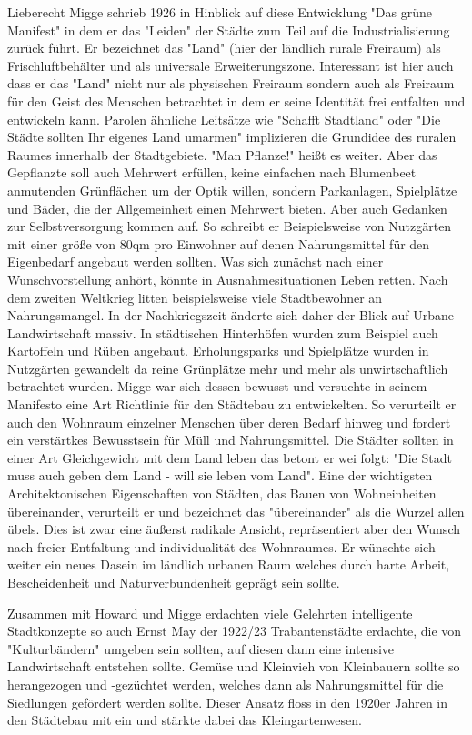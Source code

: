 \documentclass{article}
\begin{document}
Lieberecht Migge schrieb 1926 in Hinblick auf diese Entwicklung "Das grüne Manifest" in dem er das "Leiden" der Städte zum Teil auf die Industrialisierung zurück führt. Er bezeichnet das "Land" (hier der ländlich rurale Freiraum) als Frischluftbehälter und als universale Erweiterungszone. Interessant ist hier auch dass er das "Land" nicht nur als physischen Freiraum sondern auch als Freiraum für den Geist des Menschen betrachtet in dem er seine Identität frei entfalten und entwickeln kann. Parolen ähnliche Leitsätze wie "Schafft Stadtland" oder "Die Städte sollten Ihr eigenes Land umarmen" implizieren die Grundidee des ruralen Raumes innerhalb der Stadtgebiete. "Man Pflanze!" heißt es weiter. Aber das Gepflanzte soll auch Mehrwert erfüllen, keine einfachen nach Blumenbeet anmutenden Grünflächen um der Optik willen, sondern Parkanlagen, Spielplätze und Bäder, die der Allgemeinheit einen Mehrwert bieten. Aber auch Gedanken zur Selbstversorgung kommen auf. So schreibt er Beispielsweise von Nutzgärten mit einer größe von 80qm pro Einwohner auf denen Nahrungsmittel für den Eigenbedarf angebaut werden sollten. Was sich zunächst nach einer Wunschvorstellung anhört, könnte in Ausnahmesituationen Leben retten. Nach dem zweiten Weltkrieg litten beispielsweise viele Stadtbewohner an Nahrungsmangel. In der Nachkriegszeit änderte sich daher der Blick auf Urbane Landwirtschaft massiv. In städtischen Hinterhöfen wurden zum Beispiel auch Kartoffeln und Rüben angebaut. Erholungsparks und Spielplätze wurden in Nutzgärten gewandelt da reine Grünplätze mehr und mehr als unwirtschaftlich betrachtet wurden. Migge war sich dessen bewusst und versuchte in seinem Manifesto eine Art Richtlinie für den Städtebau zu entwickelten. So verurteilt er auch den Wohnraum einzelner Menschen über deren Bedarf hinweg und fordert ein verstärtkes Bewusstsein für Müll und Nahrungsmittel. Die Städter sollten in einer Art Gleichgewicht mit dem Land leben das betont er wei folgt: "Die Stadt muss auch geben dem Land - will sie leben vom Land". Eine der wichtigsten Architektonischen Eigenschaften von Städten, das Bauen von Wohneinheiten übereinander, verurteilt er und bezeichnet das "übereinander" als die Wurzel allen übels. Dies ist zwar eine äußerst radikale Ansicht, repräsentiert aber den Wunsch nach freier Entfaltung und individualität des Wohnraumes. Er wünschte sich weiter ein neues Dasein im ländlich urbanen Raum welches durch harte Arbeit, Bescheidenheit und Naturverbundenheit geprägt sein sollte.

Zusammen mit Howard und Migge erdachten viele Gelehrten intelligente Stadtkonzepte so auch Ernst May der 1922/23 Trabantenstädte erdachte, die von "Kulturbändern" umgeben sein sollten, auf diesen dann eine intensive Landwirtschaft entstehen sollte. Gemüse und Kleinvieh von Kleinbauern sollte so herangezogen und -gezüchtet werden, welches dann als Nahrungsmittel für die Siedlungen gefördert werden sollte. Dieser Ansatz floss in den 1920er Jahren in den Städtebau mit ein und stärkte dabei das Kleingartenwesen.
\end{document}
